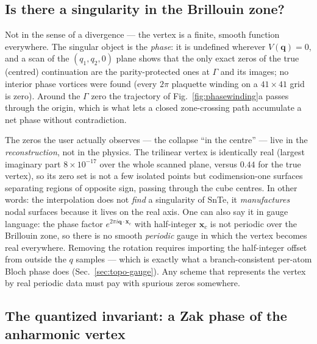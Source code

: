 \documentclass[11pt,a4paper]{article}
\newcommand{\qv}{\mathbf{q}}
\begin{document}
\subsection{Is there a singularity in the Brillouin zone?}
\label{sec:topo-singularity}

Not in the sense of a divergence --- the vertex is a finite, smooth
function everywhere.  The singular object is the \emph{phase}: it is
undefined wherever $V(\qv)=0$, and a scan of the $(q_1,q_2,0)$ plane
shows that the only exact zeros of the true (centred) continuation are
the parity-protected ones at $\Gamma$ and its images; no interior
phase vortices were found (every $2\pi$ plaquette winding on a
$41\times41$ grid is zero).  Around the $\Gamma$ zero the trajectory of
Fig.~\ref{fig:phasewinding}a passes through the origin, which is what
lets a closed zone-crossing path accumulate a net phase without
contradiction.

The zeros the user actually observes --- the collapse ``in the centre''
--- live in the \emph{reconstruction}, not in the physics.  The
trilinear vertex is identically real (largest imaginary part
$8\times10^{-17}$ over the whole scanned plane, versus $0.44$ for the
true vertex), so its zero set is not a few isolated points but
codimension-one surfaces separating regions of opposite sign, passing
through the cube centres.  In other words: the interpolation does not
\emph{find} a singularity of SnTe, it \emph{manufactures} nodal
surfaces because it lives on the real axis.  One can also say it in
gauge language: the phase factor $e^{2\pi i\qv\cdot\mathbf x_c}$ with
half-integer $\mathbf x_c$ is not periodic over the Brillouin zone, so
there is no smooth \emph{periodic} gauge in which the vertex becomes
real everywhere.  Removing the rotation requires importing the
half-integer offset from outside the $q$ samples --- which is exactly
what a branch-consistent per-atom Bloch phase does
(Sec.~\ref{sec:topo-gauge}).  Any scheme that represents the vertex by
real periodic data must pay with spurious zeros somewhere.

\subsection{The quantized invariant: a Zak phase of the anharmonic
vertex}
\label{sec:topo-invariant}
\end{document}
